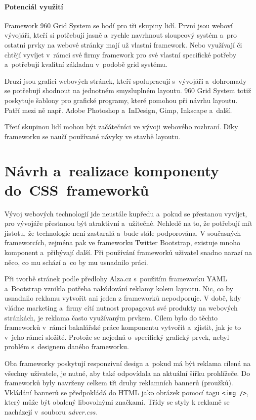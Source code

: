 \documentclass[thesis=B,czech]{FITthesis}[2012/06/26]
\begin{document}
\paragraph{Potenciál využití}

Framework 960 Grid System se hodí pro tři skupiny lidí. První jsou weboví vývojáři, kteří si potřebují jasně a~rychle navrhnout sloupcový systém a~pro ostatní prvky na webové stránky mají už vlastní framework. Nebo využívají či chtějí vyvíjet v~rámci své firmy framework pro své vlastní specifické potřeby a~potřebují kvalitní základnu v~podobě grid systému. 

Druzí jsou grafici webových stránek, kteří spolupracují s~vývojáři a~dohromady se potřebují shodnout na jednotném smysluplném layoutu. 960 Grid System totiž poskytuje šablony pro grafické programy, které pomohou při návrhu layoutu. Patří mezi ně např. Adobe Photoshop a~InDesign, Gimp, Inkscape a~další. 

Třetí skupinou lidí mohou být začátečníci ve vývoji webového rozhraní. Díky frameworku se naučí používané návyky ve stavbě layoutu.



\section{Návrh a~realizace komponenty do~CSS~frameworků}


Vývoj webových technologií jde neustále kupředu a~pokud se přestanou vyvíjet, pro vývojáře přestanou být atraktivní a~užitečné. Nehledě na to, že potřebují mít jistotu, že technologie není zastaralá a~bude stále podporována. V současných frameworcích, zejména pak ve frameworku Twitter Bootstrap, existuje mnoho komponent a~přibývají další. Při používání frameworků uživatel snadno narazí na něco, co mu schází a~co by mu usnadnilo práci.

Při tvorbě stránek podle předlohy Alza.cz s~použitím frameworku YAML a~Bootstrap vznikla potřeba nakódování reklamy kolem layoutu. Nic, co by usnadnilo reklamu vytvořit ani jeden z frameworků nepodporuje. V době, kdy vládne marketing a~firmy cítí nutnost propagovat své produkty na webových stránkách, je reklama často využívaným prvkem. Cílem bylo do těchto frameworků v~rámci bakalářské práce komponentu vytvořit a~zjistit, jak je to v~jeho rámci složité. Protože se nejedná o~specifický grafický prvek, nebyl problém s~designem daného frameworku.

Oba frameworky poskytují responzivní design a~pokud má být reklama cílená na všechny uživatele, je nutné, aby také odpovídala na aktuální šířku prohlížeče. Do frameworků byly navrženy celkem tři druhy reklamních bannerů (proužků). Vkládání bannerů se předpokládá do HTML jako obrázek pomocí tagu \verb#<img />#, který může být obalený libovolnými značkami. Třídy se styly k reklamě se nacházejí v~souboru \textit{adver.css}.
\end{document}
